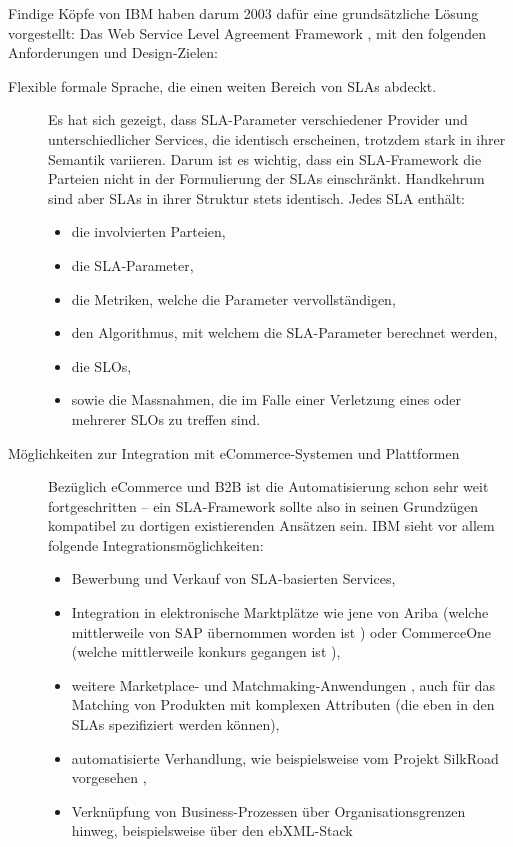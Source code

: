 \documentclass[11pt,listof=totoc]{scrreprt} %
\theoremstyle{definition}
\begin{document}
Findige Köpfe von IBM haben darum 2003 dafür eine grundsätzliche Lösung vorgestellt: Das Web Service Level Agreement Framework \cite{ibm:wslaSpec, ibm:wslaPaper}, mit den folgenden Anforderungen und Design-Zielen:
\begin{description}
\item[Flexible formale Sprache, die einen weiten Bereich von SLAs abdeckt.] Es hat sich gezeigt, dass SLA-Parameter verschiedener Provider und unterschiedlicher Services, die identisch erscheinen, trotzdem stark in ihrer Semantik variieren. Darum ist es wichtig, dass ein SLA-Framework die Parteien nicht in der Formulierung der SLAs einschränkt. Handkehrum sind aber SLAs in ihrer Struktur stets identisch. Jedes SLA enthält:
\begin{itemize}
\item die involvierten Parteien,
\item die SLA-Parameter,
\item die Metriken, welche die Parameter vervollständigen,
\item den Algorithmus, mit welchem die SLA-Parameter berechnet werden,
\item die SLOs,
\item sowie die Massnahmen, die im Falle einer Verletzung eines oder mehrerer SLOs zu treffen sind.
\end{itemize}
\item[Möglichkeiten zur Integration mit eCommerce-Systemen und Plattformen] Bezüglich eCommerce und B2B ist die Automatisierung schon sehr weit fortgeschritten -- ein SLA-Framework sollte also in seinen Grundzügen kompatibel zu dortigen existierenden Ansätzen sein. IBM sieht vor allem folgende Integrationsmöglichkeiten:
\begin{itemize}
\item Bewerbung und Verkauf von SLA-basierten Services,
\item Integration in elektronische Marktplätze wie jene von Ariba (welche mittlerweile von SAP übernommen worden ist \cite{wiki:ariba}) oder CommerceOne (welche mittlerweile konkurs gegangen ist \cite{wiki:commerceone}),
\item weitere Marketplace- und Matchmaking-Anwendungen \cite{Bichler200106}, auch für das Matching von Produkten mit komplexen Attributen (die eben in den SLAs spezifiziert werden können),
\item automatisierte Verhandlung, wie beispielsweise vom Projekt SilkRoad vorgesehen \cite{Strobel:2001:DRP:593916.593929, Stroebel00aframework},
\item Verknüpfung von Business-Prozessen über Organisationsgrenzen hinweg, beispielsweise über den ebXML-Stack \cite{wiki:ebxml, ibm:wslaPaper}

\end{itemize}
\end{description}
\end{document}
